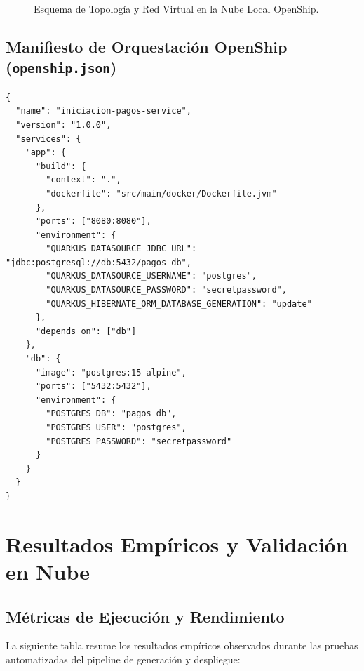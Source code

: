 \documentclass[11pt,a4paper]{report}
\begin{document}
\begin{figure}[h!]
\caption{Esquema de Topología y Red Virtual en la Nube Local OpenShip.}
\label{fig:openship_cloud}
\end{figure}

\section{Manifiesto de Orquestación OpenShip (\texttt{openship.json})}
\begin{lstlisting}[caption={Manifiesto de Despliegue OpenShip}]
{
  "name": "iniciacion-pagos-service",
  "version": "1.0.0",
  "services": {
    "app": {
      "build": {
        "context": ".",
        "dockerfile": "src/main/docker/Dockerfile.jvm"
      },
      "ports": ["8080:8080"],
      "environment": {
        "QUARKUS_DATASOURCE_JDBC_URL": "jdbc:postgresql://db:5432/pagos_db",
        "QUARKUS_DATASOURCE_USERNAME": "postgres",
        "QUARKUS_DATASOURCE_PASSWORD": "secretpassword",
        "QUARKUS_HIBERNATE_ORM_DATABASE_GENERATION": "update"
      },
      "depends_on": ["db"]
    },
    "db": {
      "image": "postgres:15-alpine",
      "ports": ["5432:5432"],
      "environment": {
        "POSTGRES_DB": "pagos_db",
        "POSTGRES_USER": "postgres",
        "POSTGRES_PASSWORD": "secretpassword"
      }
    }
  }
}
\end{lstlisting}

\newpage

\chapter{Resultados Empíricos y Validación en Nube}

\section{Métricas de Ejecución y Rendimiento}
La siguiente tabla resume los resultados empíricos observados durante las pruebas automatizadas del pipeline de generación y despliegue:
\end{document}
